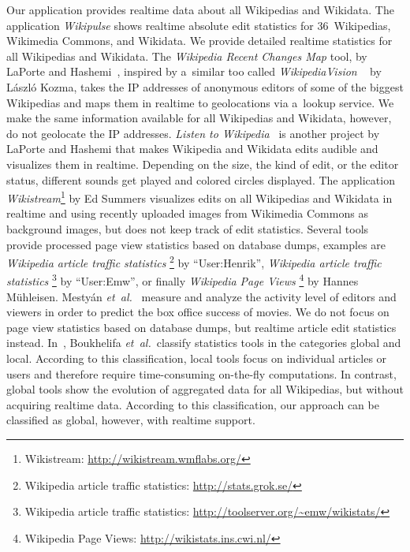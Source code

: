 \documentclass{sig-alternate}
\newcommand{\inlinelistingsize}{\fontsize{8pt}{11pt}}
\let\oldurl\url
\renewcommand{\url}[1]{\inlinelistingsize\oldurl{#1}}
\begin{document}
Our application provides realtime data about all Wikipedias and Wikidata.
The application \emph{Wikipulse} shows realtime absolute
edit statistics for 36~Wikipedias, Wikimedia Commons, and Wikidata.
We provide detailed realtime statistics for all Wikipedias and Wikidata.
The \emph{Wikipedia Recent Changes Map} tool,
by LaPorte and Hashemi~\cite{laporte2013map},
inspired by a~similar too called \emph{WikipediaVision}%
~\cite{kozma2013map} by László Kozma,
takes the IP addresses of anonymous editors
of some of the biggest Wikipedias and maps them
in realtime to geolocations via a~lookup service.
We make the same information available
for all Wikipedias and Wikidata, however,
do not geolocate the IP addresses.
\emph{Listen to Wikipedia}~\cite{laporte2013listen}
is another project by
LaPorte and Hashemi that makes Wikipedia and Wikidata edits
audible and visualizes them in realtime.
Depending on the size, the kind of edit, or the editor status,
different sounds get played and colored circles displayed.
The application \emph{Wikistream}\footnote{Wikistream:
\url{http://wikistream.wmflabs.org/}} by Ed Summers
visualizes edits on all Wikipedias and Wikidata
in realtime and using recently uploaded images from Wikimedia Commons
as background images, but does not keep track of edit statistics.
Several tools provide processed page view statistics
based on database dumps, examples are
\emph{Wikipedia article traffic statistics}%
\footnote{Wikipedia article traffic statistics:
\url{http://stats.grok.se/}} by ``User:Henrik'',
\emph{Wikipedia article traffic statistics}%
\footnote{Wikipedia article traffic statistics:
\url{http://toolserver.org/~emw/wikistats/}} by ``User:Emw'',
or finally \emph{Wikipedia Page Views}%
\footnote{Wikipedia Page Views: \url{http://wikistats.ins.cwi.nl/}}
by Hannes Mühleisen.
Mestyán \emph{et~al.}~\cite{mestyan2013boxoffice} measure and analyze the activity level of editors and viewers in order
to predict the box office success of movies.
We do not focus on page view statistics based on database dumps,
but realtime article edit statistics instead.
In~\cite{boukhelifa2010realtime}, Boukhelifa \emph{et~al.}\
classify statistics tools in the categories global and local.
According to this classification,
local tools focus on individual articles or users
and therefore require time-consuming on-the-fly computations.
In contrast,  global tools
show the evolution of aggregated data
for all Wikipedias,
but without acquiring realtime data.
According to this classification, our approach can be
classified as global, however, with realtime support.
\end{document}

